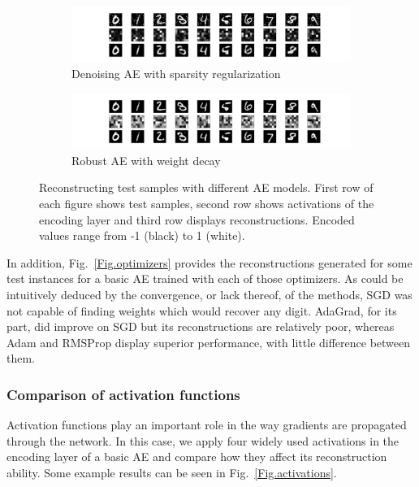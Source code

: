 \begin{figure}[htbp]
  \begin{subfigure}{0.48\figwidth}
    \includegraphics[width=\textwidth,trim={14em 0 12em 0},clip]{sparse-denoising-36-rmsprop-xent.pdf}
    \caption{\label{Fig.mnist.denoising}Denoising AE with sparsity regularization}
  \end{subfigure}
  \hfill
  \begin{subfigure}{0.48\figwidth}
    \includegraphics[width=\textwidth,trim={14em 0 12em 0},clip]{robust-wd-36-rmsprop-corr.pdf}
    \caption{\label{Fig.mnist.robust}Robust AE with weight decay}
  \end{subfigure}
  \caption{\label{Fig.mnist}Reconstructing test samples with different AE models. First row of each figure shows test samples, second row shows activations of the encoding layer and third row displays reconstructions. Encoded values range from -1 (black) to 1 (white).}
  
\end{figure}

In addition, Fig.~\ref{Fig.optimizers} provides the reconstructions generated for some test instances for a basic AE trained with each of those optimizers. As could be intuitively deduced by the convergence, or lack thereof, of the methods, SGD was not capable of finding weights which would recover any digit. AdaGrad, for its part, did improve on SGD but its reconstructions are relatively poor, whereas Adam and RMSProp display superior performance, with little difference between them.

\subsubsection{Comparison of activation functions}

Activation functions play an important role in the way gradients are propagated through the network. In this case, we apply four widely used activations in the encoding layer of a basic AE and compare how they affect its reconstruction ability. Some example results can be seen in Fig.~\ref{Fig.activations}.

